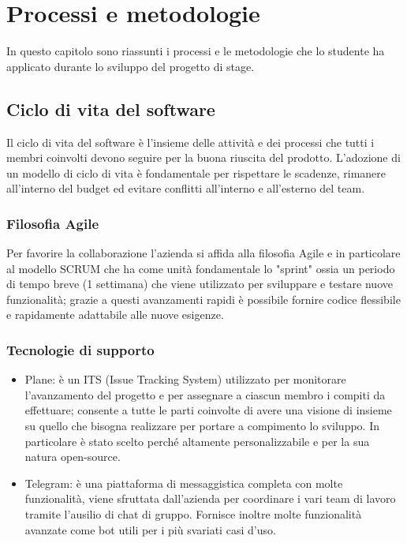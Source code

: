 \chapter{Processi e metodologie}
\label{cap:processi-metodologie}

In questo capitolo sono riassunti i processi e le metodologie che lo studente ha applicato durante lo sviluppo del progetto di stage. 


\section{Ciclo di vita del software}
Il ciclo di vita del software è l'insieme delle attività e dei processi che tutti i membri coinvolti devono seguire per la buona riuscita del prodotto.
L'adozione di un modello di ciclo di vita è fondamentale per rispettare le scadenze, rimanere all'interno del budget ed evitare conflitti all'interno e all'esterno del team.

\subsection{Filosofia Agile}
Per favorire la collaborazione l'azienda si affida alla filosofia Agile e in particolare al modello SCRUM che ha come unità fondamentale lo "sprint" ossia un periodo di tempo breve (1 settimana) che viene utilizzato per sviluppare e testare nuove funzionalità; grazie a questi avanzamenti rapidi è possibile fornire codice flessibile e rapidamente adattabile alle nuove esigenze. 

\subsection{Tecnologie di supporto}
\begin{itemize}
    \item Plane: è un ITS (Issue Tracking System) utilizzato per monitorare l'avanzamento del progetto e per assegnare a ciascun membro i compiti da effettuare; consente a tutte le parti coinvolte di avere una visione di insieme su quello che bisogna realizzare per portare a compimento lo sviluppo. In particolare è stato scelto perché altamente personalizzabile e per la sua natura open-source.
    \item Telegram: è una piattaforma di messaggistica completa con molte funzionalità, viene sfruttata dall'azienda per coordinare i vari team di lavoro tramite l'ausilio di chat di gruppo. Fornisce inoltre molte funzionalità avanzate come bot utili per i più svariati casi d'uso.
\end{itemize}

